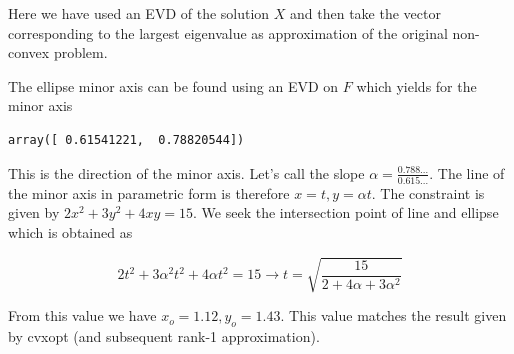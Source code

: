 Here we have used an EVD of the solution \(X\) and then take the vector corresponding to the largest eigenvalue as approximation of the original non-convex problem.

The ellipse minor axis can be found using an EVD on \(F\) which yields for the minor axis

\begin{verbatim}
array([ 0.61541221,  0.78820544])
\end{verbatim}

This is the direction of the minor axis. Let's call the slope \(\alpha = \frac{0.788\ldots}{0.615\ldots}\). The line of the minor axis in parametric form is therefore \(x = t, y = \alpha t\). The constraint is given by \(2x^2 + 3y^2 + 4xy = 15\). We seek the intersection point of line and ellipse which is obtained as

\[
2t^2 + 3\alpha^2 t^2 + 4 \alpha t^2 = 15 \rightarrow t = \sqrt{\frac{15}{2 + 4 \alpha + 3 \alpha^2}}
\]

From this value we have \(x_o =1.12, y_o = 1.43\). This value matches the result given by cvxopt (and subsequent rank-1 approximation).
